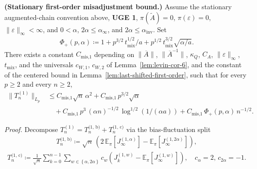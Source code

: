 \begin{lemma}\label{lem:T1-bound}
  \textbf{(Stationary first-order misadjustment bound.)}
  Assume the stationary augmented-chain convention above, \textbf{UGE 1},
  \(\pi(\widetilde{A}) = 0\), \(\pi(\varepsilon) = 0\),
  \(\lVert  \varepsilon  \rVert_\infty < \infty\), and
  \(0 < \alpha\), \(2 \alpha \le \alpha_\infty\), and
  \(2 \alpha \le \alpha_{\text{inv}}\). Set
\begin{equation}
\begin{aligned}
  \Phi_+(p, \alpha) \coloneqq 1 + p^{3 / 2} \, t_{\text{mix}}^{1 / 2} / a
                   + p^{1 / 2} \, t_{\text{mix}}^{3 / 2} \sqrt{\alpha / a}.
\end{aligned}
\end{equation}
  There exists a constant \(C_{\text{mis,1}}\) depending on
  \(\lVert\overline{A}\rVert\), \(\lVert\overline{A}^{-1}\rVert\),
  \(\kappa_Q\), \(C_A\), \(\lVert\varepsilon\rVert_\infty\),
  \(t_{\text{mix}}\), and the universals \(c_{W,1}\), \(c_{W,2}\)
  of Lemma~\ref{lem:levin-cor-6}, and the constant of the centered bound in
  Lemma~\ref{lem:last-shifted-first-order}, such that for every \(p \ge 2\) and every
  \(n \ge 2\),
\begin{equation}
\begin{aligned}
  \lVert  T_n^{(1)}  \rVert_{L_p}
    &\le C_{\text{mis,1}} \sqrt{n} \, \alpha^2
     + C_{\text{mis,1}} \, p^{3 / 2} \sqrt{\alpha} \\
    &\quad + C_{\text{mis,1}} \, p^3 \, (\alpha n)^{-1 / 2} \, \log^{1 / 2}(1 / (\alpha a))
     + C_{\text{mis,1}} \, \Phi_+(p, \alpha) \, n^{-1 / 2}.
\end{aligned}
\end{equation}
\end{lemma}

\textit{Proof.} Decompose \(T_n^{(1)} = T_n^{\text{(1, b)}} + T_n^{\text{(1, c)}}\) via the
bias-fluctuation split
\begin{equation}
\begin{aligned}
T_n^{\text{(1, b)}} \coloneqq \sqrt{n} \, \left(
                    2 \, \mathbb{E}_\pi [J_\infty^{(1, \alpha)}]
                    - \mathbb{E}_\pi [J_\infty^{(1, 2 \alpha)}]
                  \right),
\end{aligned}
\end{equation}
\begin{equation}
\begin{aligned}
T_n^{\text{(1, c)}} \coloneqq \frac{1}{\sqrt{n}} \sum_{k = 0}^{n - 1} \sum_{w \in \left\{\alpha, 2 \alpha\right\}} c_w
                   \left(J_k^{(1, w)} - \mathbb{E}_\pi [J_\infty^{(1, w)}]\right),
\quad c_\alpha = 2, \, c_{2 \alpha} = -1.
\end{aligned}
\end{equation}

